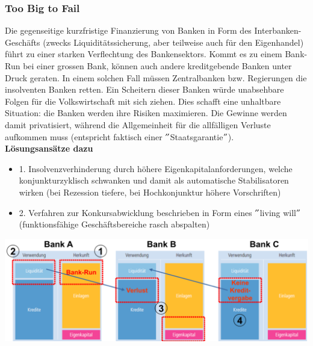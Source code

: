 \subsubsection{Too Big to Fail}
Die gegenseitige kurzfristige Finanzierung von Banken in Form des Interbanken-Geschäfts (zwecks Liquiditätssicherung, aber teilweise auch für den Eigenhandel) führt zu einer starken Verflechtung des Bankensektors. Kommt es zu einem Bank-Run bei einer grossen Bank, können auch andere kreditgebende Banken unter Druck geraten. In einem solchen Fall müssen Zentralbanken bzw. Regierungen die insolventen Banken retten. Ein Scheitern dieser Banken würde unabsehbare Folgen für die Volkswirtschaft mit sich ziehen. Dies schafft eine unhaltbare Situation: die Banken werden ihre Risiken maximieren. Die Gewinne werden damit privatisiert, während die Allgemeinheit für die allfälligen Verluste aufkommen muss (entspricht faktisch einer $"$Staatsgarantie$"$).\\
\textbf{Lösungsansätze dazu}\\
\begin{itemize}
	\item 1. Insolvenzverhinderung durch höhere Eigenkapitalanforderungen, welche konjunkturzyklisch schwanken und damit als automatische Stabilisatoren wirken (bei Rezession tiefere, bei Hochkonjunktur höhere Vorschriften)
	\item 2. Verfahren zur Konkursabwicklung beschrieben in Form eines $"$living will$"$ (funktionsfähige Geschäftsbereiche rasch abspalten)
\end{itemize}
\begin{centering}
\includegraphics[width=0.9\linewidth]{images/toobig.png}
\end{centering}

\clearpage
\pagebreak
